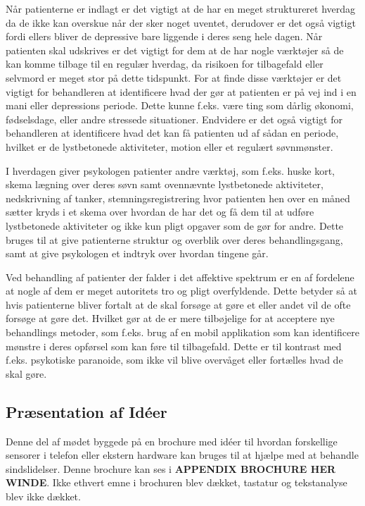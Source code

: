 Når patienterne er indlagt er det vigtigt at de har en meget struktureret hverdag da de ikke kan overskue når der sker noget uventet, derudover er det også vigtigt fordi ellers bliver de depressive bare liggende i deres seng hele dagen.
Når patienten skal udskrives er det vigtigt for dem at de har nogle værktøjer så de kan komme tilbage til en regulær hverdag, da risikoen for tilbagefald eller selvmord er meget stor på dette tidspunkt. 
For at finde disse værktøjer er det vigtigt for behandleren at identificere hvad der gør at patienten er på vej ind i en mani eller depressions periode.
Dette kunne f.eks. være ting som dårlig økonomi, fødselsdage, eller andre stressede situationer.
Endvidere er det også vigtigt for behandleren at identificere hvad det kan få patienten ud af sådan en periode, hvilket er de lystbetonede aktiviteter, motion eller et regulært søvnmønster.

I hverdagen giver psykologen patienter andre værktøj, som f.eks. huske kort, skema lægning over deres søvn samt ovennævnte lystbetonede aktiviteter, nedskrivning af tanker, stemningsregistrering hvor patienten hen over en måned sætter kryds i et skema over hvordan de har det og få dem til at udføre lystbetonede aktiviteter og ikke kun pligt opgaver som de gør for andre. 
Dette bruges til at give patienterne struktur og overblik over deres behandlingsgang, samt at give psykologen et indtryk over hvordan tingene går.  

Ved behandling af patienter der falder i det affektive spektrum er en af fordelene at nogle af dem er meget autoritets tro og pligt overfyldende.
Dette betyder så at hvis patienterne bliver fortalt at de skal forsøge at gøre et eller andet vil de ofte forsøge at gøre det.
Hvilket gør at de er mere tilbøjelige for at acceptere nye behandlings metoder, som f.eks. brug af en mobil applikation som kan identificere mønstre i deres opførsel som kan føre til tilbagefald. 
Dette er til kontrast med f.eks. psykotiske paranoide, som ikke vil blive overvåget eller fortælles hvad de skal gøre. 

\subsection{Præsentation af Idéer}
Denne del af mødet byggede på en brochure med idéer til hvordan forskellige sensorer i telefon eller ekstern hardware kan bruges til at hjælpe med at behandle sindslidelser. 
Denne brochure kan ses i \textbf{APPENDIX BROCHURE HER WINDE}.
Ikke ethvert emne i brochuren blev dækket, tastatur og tekstanalyse blev ikke dækket.

